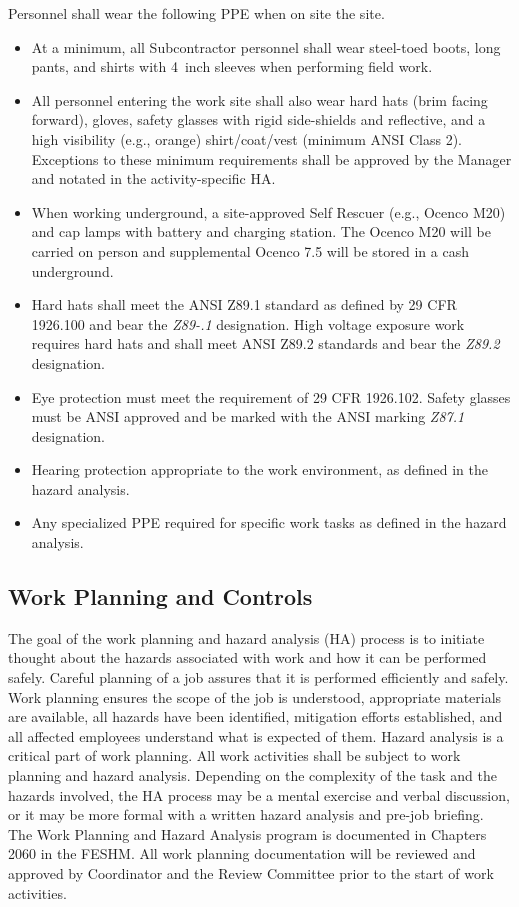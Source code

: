 Personnel shall wear the following PPE when on site the \surf site.
\begin{itemize}
  \item At a minimum, all Subcontractor personnel shall wear
    steel-toed boots, long pants, and shirts with 4~inch sleeves when
    performing field work.
  \item All personnel entering the work site shall also wear hard hats
    (brim facing forward), gloves, safety glasses with rigid
    side-shields and reflective, and a high visibility (e.g., orange)
    shirt/coat/vest (minimum ANSI Class 2).  Exceptions to these
    minimum requirements shall be approved by the   Manager and
    notated in the activity-specific HA.
  \item When working underground, a site-approved Self Rescuer (e.g.,
    Ocenco M20) and cap lamps with battery and charging station. The
    Ocenco M20 will be carried on person and supplemental Ocenco
    7.5 will be stored in a cash underground.
   \item Hard hats shall meet the ANSI Z89.1 standard as defined by 29
     CFR 1926.100 and bear the {\em Z89-.1} designation. High
     voltage exposure work requires hard hats and shall meet ANSI
     Z89.2 standards and bear the {\em Z89.2} designation.
    \item Eye protection must meet the requirement of 29 CFR
      1926.102. Safety glasses must be ANSI approved and be marked
      with the ANSI marking {\em Z87.1} designation.
    \item Hearing protection appropriate to the work environment, as
      defined in the hazard analysis.
    \item Any specialized PPE required for specific work tasks as
      defined in the hazard analysis.
\end{itemize}

\subsection{Work Planning and Controls}

The goal of the work planning and hazard analysis (HA) process is to
initiate thought about the hazards associated with work and how it can
be performed safely. Careful planning of a job assures that it is
performed efficiently and safely. Work planning ensures the scope of
the job is understood, appropriate materials are available, all
hazards have been identified, mitigation efforts established, and all
affected employees understand what is expected of them. Hazard
analysis is a critical part of work planning. All work activities
shall be subject to work planning and hazard analysis. Depending on
the complexity of the task and the hazards involved, the HA process
may be a mental exercise and verbal discussion, or it may be more
formal with a written hazard analysis and pre-job briefing. The Work
Planning and Hazard Analysis program is documented in Chapters 2060 in
the FESHM. All work planning documentation will be reviewed and
approved by   Coordinator and the 
 Review Committee prior to the start of work activities.

